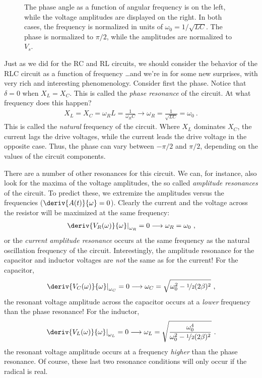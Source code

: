 \documentclass[12pt]{article}
\begin{document}
\begin{figure}
  \centering
  \subfloat[][Phases]{
  }
  \caption{The phase angle as a function of angular frequency is on
    the left, while the voltage amplitudes are displayed on the right.
    In both cases, the frequency is normalized in units of $\omega_0 =
    1/\sqrt{LC}$.  The phase is normalized to $\pi/2$, while the
    amplitudes are normalized to $V_s$.}
  \label{fig:frequency}
\end{figure}
Just as we did for the RC and RL circuits, we should consider the
behavior of the RLC circuit as a function of frequency \ldots and
we're in for some new surprises, with very rich and interesting
phenomenology. Consider first the phase.  Notice that $\delta=0$ when
$X_L = X_C$.  This is called the \textit{phase resonance} of the
circuit.  At what frequency does this happen?
\begin{gather*}
  X_L = X_C = \omega_R L = \frac{1}{\omega_R C} \longrightarrow
  \omega_R = \frac{1}{\sqrt{LC}} = \omega_0\ .
\end{gather*}
This is called the \textit{natural} frequency of the circuit.  Where
$X_L$ dominates $X_C$, the current lags the drive voltages, while the
current leads the drive voltage in the opposite case.  Thus, the phase
can vary between $-\pi/2$ and $\pi/2$, depending on the values of the
circuit components.

There are a number of other resonances for this circuit.  We can, for
instance, also look for the maxima of the voltage amplitudes, the so
called \textit{amplitude resonances} of the circuit.  To predict
these, we extremize the amplitudes versus the frequencies
($\deriv{A(t)}{\omega} = 0$).  Clearly the current and the voltage
across the resistor will be maximized at the same frequency:
\begin{gather*}
  \left.\deriv{V_R(\omega)}{\omega}\right|_{\omega_R} = 0
  \longrightarrow \omega_R = \omega_0\ ,
\end{gather*}
or the \textit{current amplitude resonance} occurs at the same
frequency as the natural oscillation frequency of the circuit.
Interestingly, the amplitude resonance for the capacitor and inductor
voltages are \textit{not} the same as for the current!  For the
capacitor,
\begin{gather*}
  \left.\deriv{V_C(\omega)}{\omega}\right|_{\omega_C} = 0 
  \longrightarrow \omega_C = \sqrt{\omega_0^2 -
      \nicefrac{1}{2}(2\beta)^2}\ ,
\end{gather*}
the resonant voltage amplitude across the capacitor occurs at a
\textit{lower} frequency than the phase resonance!  For the inductor,
\begin{gather*}
  \left.\deriv{V_L(\omega)}{\omega}\right|_{\omega_L} = 0 
  \longrightarrow \omega_L = \sqrt{
      \frac{\omega_0^4}{\omega_0^2 - \nicefrac{1}{2}(2\beta)^2}
    }\ .
\end{gather*}
the resonant voltage amplitude occurs at a frequency \textit{higher}
than the phase resonance.  Of course, these last two resonance
conditions will only occur if the radical is real.
\end{document}
